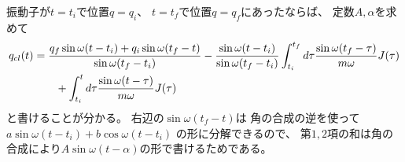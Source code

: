 振動子が$t=t_i$で位置$q=q_i$、
$t=t_f$で位置$q=q_f$にあったならば、
定数$A, \alpha$を求めて
\begin{align}
    q_{cl}(t)
    &=
    \frac{
        q_f \sin \omega (t - t_i)
        +
        q_i \sin \omega (t_f - t)
    }{ \sin \omega (t_f - t_i) }
    -
    \frac{ \sin \omega (t - t_i) }{
        \sin \omega(t_f - t_i)
    }
    \int_{t_i}^{t_f} d\tau
    \frac{ \sin \omega (t_f-\tau) }{m\omega}
    J(\tau)
\notag\\&\qquad
    +
    \int_{t_i}^t d\tau
    \frac{ \sin \omega (t-\tau)}{m\omega}
    J(\tau)
\label{classical solution to harmonic oscillator with source}
\end{align}
と書けることが分かる。
右辺の$\sin\omega(t_f - t)$は
角の合成の逆を使って
$a \sin \omega(t - t_i) + b \cos \omega(t - t_i)$
の形に分解できるので、
第$1, 2$項の和は角の合成により$A\sin\omega (t-\alpha)$の形で書けるためである。

